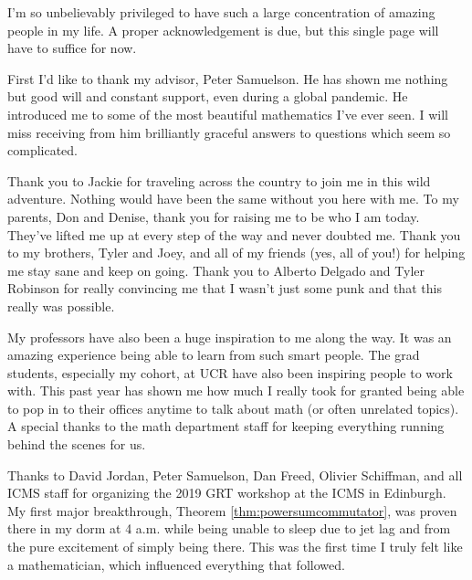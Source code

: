 \begin{acknowledgements}

I'm so unbelievably privileged to have such a large concentration of amazing people in my life. A proper acknowledgement is due, but this single page will have to suffice for now.

First I'd like to thank my advisor, Peter Samuelson. He has shown me nothing but good will and constant support, even during a global pandemic. He introduced me to some of the most beautiful mathematics I've ever seen. I will miss receiving from him brilliantly graceful answers to questions which seem so complicated. 

Thank you to Jackie for traveling across the country to join me in this wild adventure. Nothing would have been the same without you here with me. To my parents, Don and Denise, thank you for raising me to be who I am today. They've lifted me up at every step of the way and never doubted me. Thank you to my brothers, Tyler and Joey, and all of my friends (yes, all of you!) for helping me stay sane and keep on going. Thank you to Alberto Delgado and Tyler Robinson for really convincing me that I wasn't just some punk and that this really was possible. 

My professors have also been a huge inspiration to me along the way. It was an amazing experience being able to learn from such smart people. The grad students, especially my cohort, at UCR have also been inspiring people to work with. This past year has shown me how much I really took for granted being able to pop in to their offices anytime to talk about math (or often unrelated topics). A special thanks to the math department staff for keeping everything running behind the scenes for us.

Thanks to David Jordan, Peter Samuelson, Dan Freed, Olivier Schiffman, and all ICMS staff for organizing the 2019 GRT workshop at the ICMS in Edinburgh. My first major breakthrough, Theorem \ref{thm:powersumcommutator}, was proven there in my dorm at 4 a.m. while being unable to sleep due to jet lag and from the pure excitement of simply being there. This was the first time I truly felt like a mathematician, which influenced everything that followed.
\end{acknowledgements}
